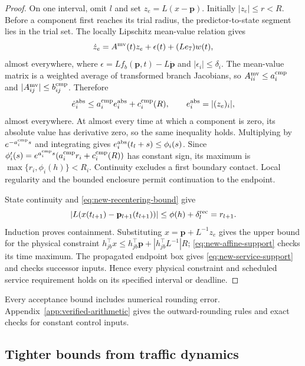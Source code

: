 \documentclass[final]{cas-sc}
\theoremstyle{definition}
\theoremstyle{plain}
\theoremstyle{definition}
\theoremstyle{plain}
\newcommand{\appref}[1]{Appendix~\ref{#1}}
\begin{document}
\begin{proof}
On one interval, omit $l$ and set $z_e=L(x-\mathbf p)$. Initially
$|z_e|\le r<R$. Before a component first reaches its trial radius, the
predictor-to-state segment lies in the trial set. The locally Lipschitz
mean-value relation \cite{clarke1990optimization} gives
\begin{equation}
\dot z_e=A^{\rm mv}(t)z_e+\epsilon(t)+(Le_7)w(t),
\label{eq:new-error-dynamics}
\end{equation}
almost everywhere, where
$\epsilon=Lf_b(\mathbf p,t)-L\dot{\mathbf p}$ and
$|\epsilon_i|\le\delta_i$. The mean-value matrix is a weighted average
of transformed branch Jacobians, so
$A_{ii}^{\rm mv}\le a_i^{\rm cmp}$ and
$|A_{ij}^{\rm mv}|\le b_{ij}^{\rm cmp}$. Therefore
\begin{equation}
\dot e_i^{\rm abs}\le a_i^{\rm cmp}e_i^{\rm abs}+c_i^{\rm cmp}(R),
\qquad e_i^{\rm abs}=|(z_e)_i|,
\label{eq:new-error-comparison-proof}
\end{equation}
almost everywhere. At almost every time at which a component is zero,
its absolute value has derivative zero, so the same inequality holds.
Multiplying by $e^{-a_i^{\rm cmp}s}$ and integrating gives
$e_i^{\rm abs}(t_l+s)\le\phi_i(s)$. Since
$\phi_i'(s)=e^{a_i^{\rm cmp}s}(a_i^{\rm cmp}r_i+c_i^{\rm cmp}(R))$ has
constant sign, its maximum is $\max\{r_i,\phi_i(h)\}<R_i$. Continuity
excludes a first boundary contact. Local regularity and the bounded
enclosure permit continuation to the endpoint.

State continuity and \eqref{eq:new-recentering-bound} give
\[
|L(x(t_{l+1})-\mathbf p_{l+1}(t_{l+1}))|
\le\phi(h)+\delta_l^{\rm rec}=r_{l+1}.
\]
Induction proves containment. Substituting
$x=\mathbf p+L^{-1}z_e$ gives the upper bound for the physical
constraint
$h_{jb}^\top x\le h_{jb}^\top\mathbf p+|h_{jb}^\top L^{-1}|R$;
\eqref{eq:new-affine-support} checks its time maximum. The propagated
endpoint box gives \eqref{eq:new-service-support} and checks successor
inputs. Hence every physical constraint and scheduled service
requirement holds on its specified interval or deadline.
\end{proof}

Every acceptance bound includes numerical rounding error.
\appref{app:verified-arithmetic} gives the outward-rounding rules and
exact checks for constant control inputs.

\subsection{Tighter bounds from traffic dynamics}
\label{sec:structure-certificate}
\label{app:structure-proof}
\end{document}
